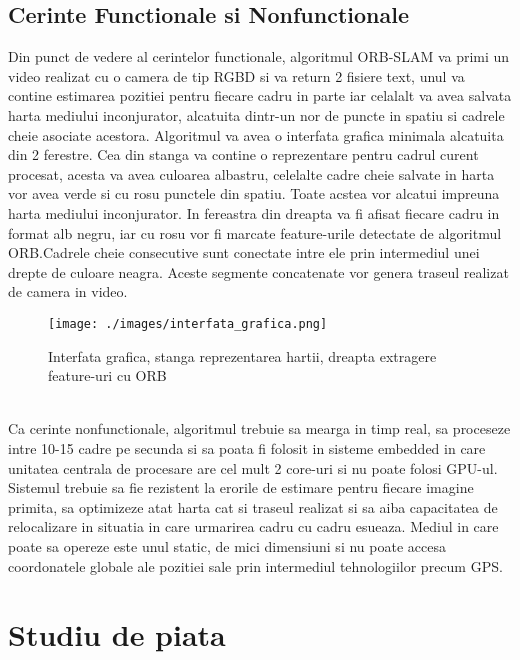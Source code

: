 \documentclass[12pt,a4paper]{report}
\begin{document}
\section{Cerinte Functionale si Nonfunctionale}
Din punct de vedere al cerintelor functionale, algoritmul ORB-SLAM va primi 
un video realizat cu o camera de tip RGBD si va return 2 fisiere text, unul va contine
estimarea pozitiei pentru fiecare cadru in parte iar celalalt va avea salvata harta 
mediului inconjurator, alcatuita dintr-un nor de puncte in spatiu si cadrele cheie
asociate acestora. Algoritmul va avea o interfata grafica minimala alcatuita din 2 
ferestre. Cea din stanga va contine o reprezentare pentru cadrul curent procesat, 
acesta va avea culoarea albastru, celelalte cadre cheie salvate in harta vor avea 
verde si cu rosu punctele din spatiu. Toate acstea vor alcatui impreuna harta mediului
inconjurator. In fereastra din dreapta va fi afisat fiecare cadru in format alb negru,
iar cu rosu vor fi marcate feature-urile detectate de algoritmul ORB.\@ Cadrele cheie 
consecutive sunt conectate intre ele prin intermediul unei drepte de culoare neagra.
Aceste segmente concatenate vor genera traseul realizat de camera in video. 
\begin{figure}[htbp] 
  \centering
  \texttt{[image: ./images/interfata\_grafica.png]}
  \caption{Interfata grafica, stanga reprezentarea hartii, dreapta extragere feature-uri cu ORB}
  \label{fig:exemplu_imagine}
\end{figure}  \\         
Ca cerinte nonfunctionale, algoritmul trebuie sa mearga in timp real, sa 
proceseze intre 10{-}15 cadre pe secunda si sa poata fi folosit in sisteme embedded
in care unitatea centrala de procesare are cel mult 2 core-uri si nu poate folosi GPU-ul.
Sistemul trebuie sa fie
rezistent la erorile de estimare pentru fiecare imagine primita, sa optimizeze atat
harta cat si traseul realizat si sa aiba capacitatea de relocalizare in situatia in care
urmarirea cadru cu cadru esueaza. Mediul in care poate sa opereze este unul static, de
mici dimensiuni si nu poate accesa coordonatele globale ale pozitiei sale prin intermediul
tehnologiilor precum GPS.\@

\chapter{Studiu de piata}
\end{document}
